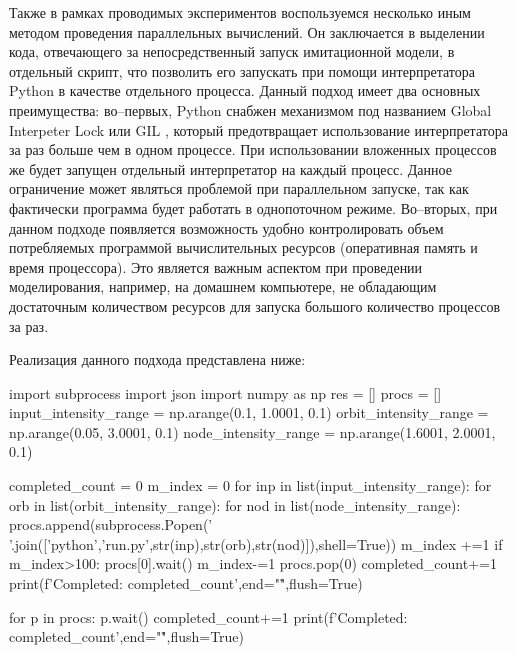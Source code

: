 Также в рамках проводимых экспериментов воспользуемся несколько иным методом проведения параллельных вычислений. Он заключается в выделении кода, отвечающего за непосредственный запуск имитационной модели, в отдельный скрипт, что позволить его запускать при помощи интерпретатора Python в качестве отдельного процесса. Данный подход имеет два основных преимущества: во--первых, Python снабжен механизмом под названием Global Interpeter Lock или GIL \cite{gil}, который предотвращает использование интерпретатора за раз больше чем в одном процессе. При использовании вложенных процессов же будет запущен отдельный интерпретатор на каждый процесс. Данное ограничение может являться проблемой при параллельном запуске, так как фактически программа будет работать в однопоточном режиме. Во--вторых, при данном подходе появляется возможность удобно контролировать объем потребляемых программой вычислительных ресурсов (оперативная память и время процессора). Это является важным аспектом при проведении моделирования, например, на домашнем компьютере, не обладающим достаточным количеством ресурсов для запуска большого количество процессов за раз.

Реализация данного подхода представлена ниже:

\begin{pyin} 
import subprocess
import json
import numpy as np
res = []
procs = []
input_intensity_range = np.arange(0.1, 1.0001, 0.1)
orbit_intensity_range = np.arange(0.05, 3.0001, 0.1)
node_intensity_range = np.arange(1.6001, 2.0001, 0.1)

completed_count = 0
m_index = 0
for inp in list(input_intensity_range):
   for orb in list(orbit_intensity_range):
      for nod in list(node_intensity_range):
         procs.append(subprocess.Popen(' '.join(['python','run.py',str(inp),str(orb),str(nod)]),shell=True))
         m_index +=1
         if m_index>100:
            procs[0].wait()
            m_index-=1
            procs.pop(0)
            completed_count+=1
            print(f'Completed: {completed_count}',end="\r",flush=True)


for p in procs:
   p.wait()
   completed_count+=1
   print(f'Completed: {completed_count}',end="\r",flush=True)
\end{pyin}


